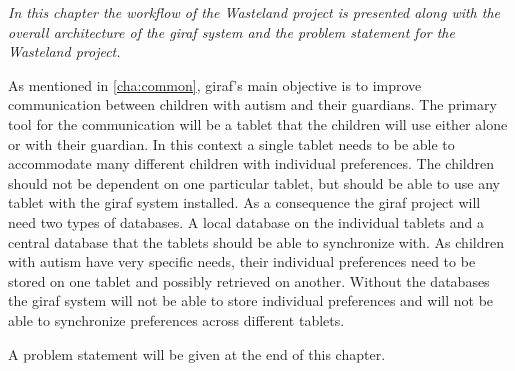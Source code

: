 \emph{In this chapter the workflow of the Wasteland project is presented along with the overall architecture of the \ac{giraf} system and the problem statement for the Wasteland project.}

\vspace{10px}

As mentioned in \autoref{cha:common}, \ac{giraf}'s main objective is to improve communication between children
with autism and their guardians. The primary tool for the communication will be a tablet that the children will
use either alone or with their guardian. In this context a single tablet needs to be able to accommodate many
different children with individual preferences. The children should not be dependent on one particular tablet, but
should be able to use any tablet with the \ac{giraf} system installed. 
As a consequence the \ac{giraf} project will need two types of databases. A local database on the individual
tablets and a central database that the tablets should be able to synchronize with. As children with autism have
very specific needs, their individual preferences need to be stored on one tablet and possibly retrieved on
another. Without the databases the \ac{giraf} system will not be able to store individual preferences and will not
be able to synchronize preferences across different tablets.

A problem statement will be given at the end of this chapter.